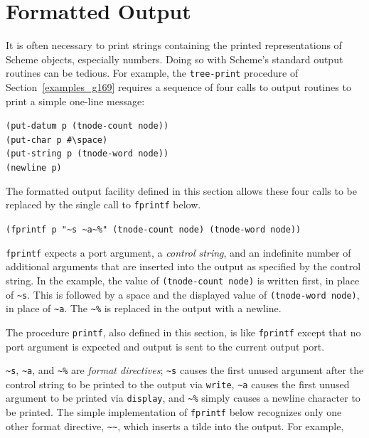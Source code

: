 \section{\label{examples_g180}\label{examples_h6}Formatted Output\label{examples_SECTEXPRINTF}}



It is often necessary to print strings containing the printed
representations of Scheme objects, especially numbers.
Doing so with Scheme's standard output routines can be tedious.
For example, the \texttt{tree-print} procedure of Section \ref{examples_g169}
requires a sequence of four calls to output routines
to print a simple one-line message:


\begin{alltt}
(put-datum p (tnode-count node))
(put-char p \#{}\textbackslash{}space)
(put-string p (tnode-word node))
(newline p)
\end{alltt}


The \label{examples_s37}formatted output facility defined in this section allows
these four calls to be replaced by the single call to \texttt{fprintf}
below.


\texttt{(fprintf p "\~{}s \~{}a\~{}\%{}" (tnode-count node) (tnode-word node))}

\label{examples_s38}\texttt{fprintf} expects a port argument, a \textit{control string}, and
an indefinite number of additional arguments that are inserted into the
output as specified by the control string.
In the example, the value of \texttt{(tnode-count node)} is written
first, in place of \texttt{\~{}s}.
This is followed by a space and the displayed value of
\texttt{(tnode-word node)}, in place of \texttt{\~{}a}.
The \texttt{\~{}\%{}} is replaced in the output with a newline.


The procedure \label{examples_s39}\texttt{printf}, also defined in this section, is like
\texttt{fprintf} except that no port argument is expected and output
is sent to the current output port.

\texttt{\~{}s}, \texttt{\~{}a}, and \texttt{\~{}\%{}} are \textit{format directives};
\texttt{\~{}s} causes the first unused argument after the control string to be
printed to the output via \texttt{write},
\texttt{\~{}a} causes the first unused argument to be printed via \texttt{display},
and \texttt{\~{}\%{}} simply causes a newline character to be printed.
The simple implementation of \texttt{fprintf} below recognizes only one other
format directive, \texttt{\~{}\~{}}, which inserts a tilde into the output.
For example,

